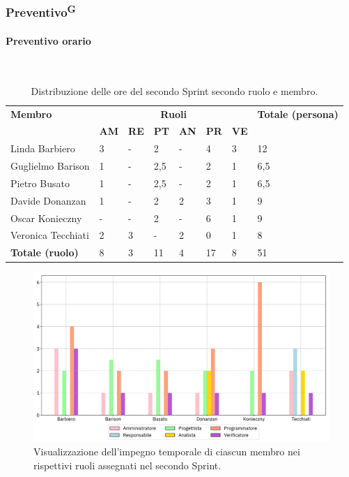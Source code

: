 \documentclass[8pt]{article}
\newcommand{\glossterm}[1]{#1\textsuperscript{G}} %
\newcommand{\subsubsubsection}[1]{\paragraph{#1}\mbox{}\\}
\begin{document}
\subsubsection{\glossterm{Preventivo}}
\subsubsubsection{Preventivo orario}
\begin{table}[ht!]
	\centering
	\begin{tabular}{p{4cm} p{1cm} p{1cm} p{1cm} p{1cm} p{1cm} p{1cm} p{3cm}}
        \toprule
        \textbf{Membro} & \multicolumn{6}{c}{\textbf{Ruoli}} & \textbf{Totale (persona)}\\
		& \textbf{AM} & \textbf{RE} & \textbf{PT} & \textbf{AN} & \textbf{PR} & \textbf{VE}\\
		\midrule
        Linda Barbiero          & 3     & -     & 2     & -     & 4     & 3     & 12 \\
        Guglielmo Barison       & 1     & -     & 2,5     & -     & 2   & 1     & 6,5\\
        Pietro Busato           & 1     & -     & 2,5     & -     & 2   & 1     & 6,5 \\
        Davide Donanzan         & 1     & -     & 2     & 2     & 3     & 1   & 9 \\
        Oscar Konieczny         & -     & -     & 2     & -     & 6     & 1     & 9 \\
        Veronica Tecchiati      & 2     & 3     & -     & 2     & 0     & 1     & 8 \\
        \bottomrule
        \textbf{Totale (ruolo)} & 8     & 3     & 11     & 4   & 17     & 8   & 51 \\
	\end{tabular}
	\caption{Distribuzione delle ore del secondo Sprint secondo ruolo e membro.}
	\label{table:Distribuzione delle ore del secondo Sprint secondo ruolo e membro}
\end{table}
\begin{figure}[ht!]
    \centering
    \includegraphics[width=15cm]{./images_pdp/istogramma_periodo_2.png}
    \caption{Visualizzazione dell’impegno temporale di ciascun membro nei rispettivi ruoli assegnati
    nel secondo Sprint.}
    \label{figure:Visualizzazione dell’impegno temporale di ciascun membro nei rispettivi ruoli
    assegnati nel secondo Sprint}
\end{figure}
\end{document}
